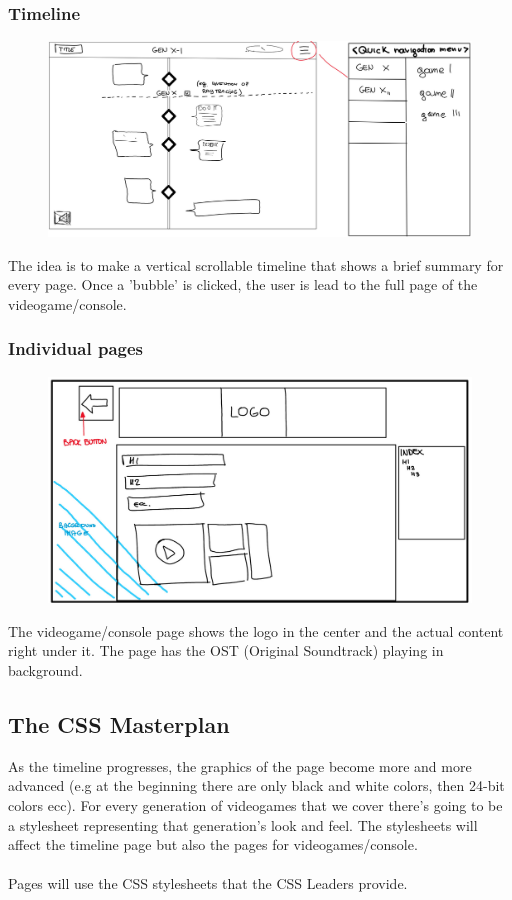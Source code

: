 \documentclass[a4paper,10pt]{article}
\begin{document}
    \subsubsection{Timeline}
        \begin{figure}[h]
        \includegraphics[width=.7\linewidth]{media/timeline_sketch.jpg}
        \end{figure}
        The idea is to make a vertical scrollable timeline that shows a brief summary for every page. Once a 'bubble' is clicked, the user is lead to the full page of the videogame/console.
    \subsubsection{Individual pages}
        \begin{figure}[h!]
        \includegraphics[width=.5\linewidth]{media/page_sketch.jpg}
        \end{figure}
        The videogame/console page shows the logo in the center and the actual content right under it. The page has the OST (Original Soundtrack) playing in background.
    \newpage
    \subsection{The CSS Masterplan}
        As the timeline progresses, the graphics of the page become more and more advanced (e.g at the beginning there are only black and white colors, then 24-bit colors ecc).
        For every generation of videogames that we cover there's going to be a stylesheet representing that generation's look and feel. The stylesheets will affect the timeline page but also the pages for videogames/console.\\\\
        Pages will use the CSS stylesheets that the CSS Leaders provide.
\end{document}
